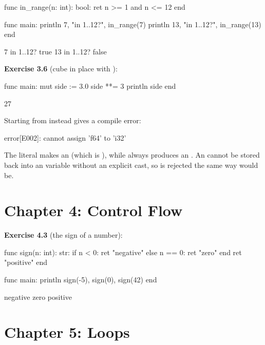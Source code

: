 \begin{salamen}
func in_range(n: int): bool:
    ret n >= 1 and n <= 12
end

func main:
    println 7, "in 1..12?", in_range(7)
    println 13, "in 1..12?", in_range(13)
end
\end{salamen}

\begin{progout}
7 in 1..12? true
13 in 1..12? false
\end{progout}

\textbf{Exercise 3.6} (cube in place with \code{**=}):

\begin{salamen}
func main:
    mut side := 3.0
    side **= 3
    println side
end
\end{salamen}

\begin{progout}
27
\end{progout}

Starting from  instead gives a compile error:

\begin{shell}
error[E002]: cannot assign 'f64' to 'i32'
\end{shell}

\noindent The literal  makes  an  (which is
), while \code{**} always produces an . An  cannot
be stored back into an  variable without an explicit 
cast, so  is rejected the same way 
would be.

\section*{Chapter 4: Control Flow}

\textbf{Exercise 4.3} (the sign of a number):

\begin{salamen}
func sign(n: int): str:
    if n < 0:
        ret "negative"
    else n == 0:
        ret "zero"
    end
    ret "positive"
end

func main:
    println sign(-5), sign(0), sign(42)
end
\end{salamen}

\begin{progout}
negative zero positive
\end{progout}

\section*{Chapter 5: Loops}


